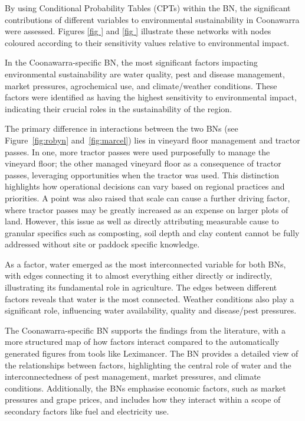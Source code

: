 By using Conditional Probability Tables (CPTs) within the BN, the significant contributions of different variables to environmental sustainability in Coonawarra were assessed. Figures \ref{fig
  } and \ref{fig
  } illustrate these networks with nodes coloured according to their sensitivity values relative to environmental impact.

In the Coonawarra-specific BN, the most significant factors impacting environmental sustainability are water quality, pest and disease management, market pressures, agrochemical use, and climate/weather conditions. These factors were identified as having the highest sensitivity to environmental impact, indicating their crucial roles in the sustainability of the region.

The primary difference in interactions between the two BNs (see Figure~\ref{fig:robyn} and~\ref{fig:marcel}) lies in vineyard floor management and tractor passes. In one, more tractor passes were used purposefully to manage the vineyard floor; the other managed vineyard floor as a consequence of tractor passes, leveraging opportunities when the tractor was used. This distinction highlights how operational decisions can vary based on regional practices and priorities. A point was also raised that scale can cause a further driving factor, where tractor passes may be greatly increased as an expense on larger plots of land. However, this issue as well as directly attributing measurable cause to granular specifics such as composting, soil depth and clay content cannot be fully addressed without site or paddock specific knowledge.

As a factor, water emerged as the most interconnected variable for both BNs, with edges connecting it to almost everything either directly or indirectly, illustrating its fundamental role in agriculture. The edges between different factors reveals that water is the most connected. Weather conditions also play a significant role, influencing water availability, quality and disease/pest pressures.

The Coonawarra-specific BN supports the findings from the literature, with a more structured map of how factors interact compared to the automatically generated figures from tools like Leximancer. The BN provides a detailed view of the relationships between factors, highlighting the central role of water and the interconnectedness of pest management, market pressures, and climate conditions. Additionally, the BNs emphasise economic factors, such as market pressures and grape prices, and includes how they interact within a scope of secondary factors like fuel and electricity use.

